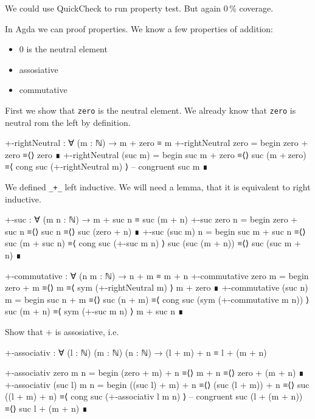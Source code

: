 We could use QuickCheck to run property test. But again 0\,\% coverage.

In Agda we can proof properties. We know a few properties of addition:
\begin{itemize}
  \item $0$ is the neutral element
  \item assosiative
  \item commutative
\end{itemize}

First we show that \verb+zero+ is the neutral element. We already
know that \verb+zero+ is neutral rom the left by definition.
\begin{code}
+-rightNeutral : ∀ (m : ℕ) → m + zero ≡ m
+-rightNeutral zero =
  begin
    zero + zero
  ≡⟨⟩
    zero
  ∎
+-rightNeutral (suc m) =
  begin
    suc m + zero
  ≡⟨⟩
    suc (m + zero)
  ≡⟨ cong  suc (+-rightNeutral m) ⟩ -- congruent
    suc m
  ∎
\end{code}

We defined \verb=_+_= left inductive. We will need a lemma, that
it is equivalent to right inductive.
\begin{code}
+-suc : ∀ (m n : ℕ) → m + suc n ≡ suc (m + n)
+-suc zero n =
  begin
    zero + suc n
  ≡⟨⟩
    suc n
  ≡⟨⟩
    suc (zero + n)
  ∎
+-suc (suc m) n =
  begin
    suc m + suc n
  ≡⟨⟩
    suc (m + suc n)
  ≡⟨ cong suc (+-suc m n) ⟩
    suc (suc (m + n))
  ≡⟨⟩
    suc (suc m + n)
  ∎
\end{code}

\begin{code}
+-commutative : ∀ (n m : ℕ) → n + m ≡ m + n
+-commutative zero m =
  begin
    zero + m
  ≡⟨⟩
    m
  ≡⟨ sym (+-rightNeutral m) ⟩
    m + zero
  ∎
+-commutative (suc n) m =
  begin
    suc n + m
  ≡⟨⟩
    suc (n + m)
  ≡⟨ cong suc (sym (+-commutative m n)) ⟩
    suc (m + n)
  ≡⟨ sym (+-suc m n) ⟩
    m + suc n
  ∎
\end{code}

\begin{exercise}
Show that $+$ is assosiative, i.e.

\begin{code}
+-associativ : ∀ (l : ℕ) (m : ℕ) (n : ℕ)
  → (l + m) + n ≡ l + (m + n)
\end{code}
\end{exercise}

\begin{code}
+-associativ zero m n =
  begin
    (zero + m) + n
  ≡⟨⟩
    m + n
  ≡⟨⟩
    zero + (m + n)
  ∎
+-associativ (suc l) m n =
  begin
    ((suc l) + m) + n
  ≡⟨⟩
    (suc (l + m)) + n
  ≡⟨⟩
    suc ((l + m) + n)
  ≡⟨ cong suc (+-associativ l m n) ⟩ -- congruent
    suc (l + (m + n))
  ≡⟨⟩
   suc l + (m + n)
  ∎
\end{code}

